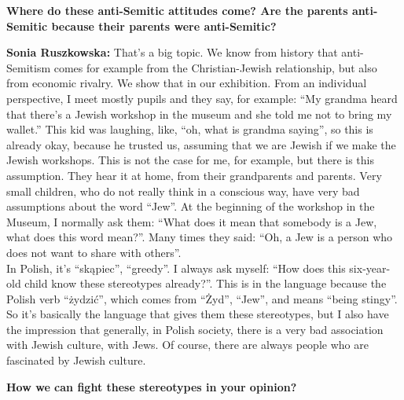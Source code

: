 \textbf{Where do these anti-Semitic attitudes come? Are the parents anti-Semitic because their parents were anti-Semitic?} 

\textbf{Sonia Ruszkowska:} That’s a big topic. We know from history that anti-Semitism comes for example from the Christian-Jewish relationship, but also from economic rivalry. We show that in our exhibition. From an individual perspective, I meet mostly pupils and they say, for example: ``My grandma heard that there’s a Jewish workshop in the museum and she told me not to bring my wallet.'' This kid was laughing, like, ``oh, what is grandma saying'', so this is already okay, because he trusted us, assuming that we are Jewish if we make the Jewish workshops. This is not the case for me, for example, but there is this assumption. They hear it at home, from their grandparents and parents. Very small children, who do not really think in a conscious way, have very bad assumptions about the word ``Jew''. At the beginning of the workshop in the Museum, I normally ask them: ``What does it mean that somebody is a Jew, what does this word mean?''. Many times they said: ``Oh, a Jew is a person who does not want to share with others''.\\ 
In Polish, it’s ``skąpiec'', ``greedy''. I always ask myself: ``How does this six-year-old child know these stereotypes already?''. This is in the language because the Polish verb ``żydzić'', which comes from ``Żyd'', ``Jew'', and means ``being stingy''. So it’s basically the language that gives them these stereotypes, but I also have the impression that generally, in Polish society, there is a very bad association with Jewish culture, with Jews. Of course, there are always people who are fascinated by Jewish culture. 

\textbf{How we can fight these stereotypes in your opinion?}

